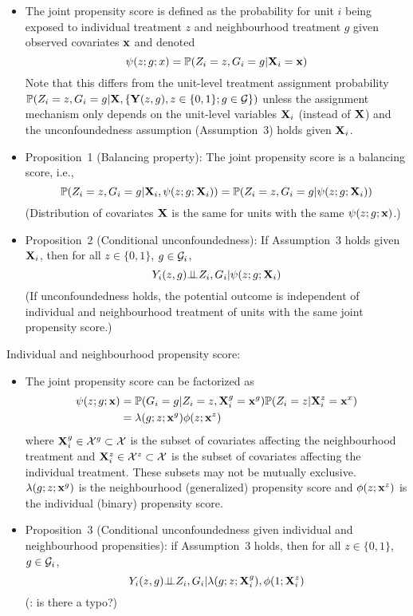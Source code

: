 \documentclass[10pt]{article}
\begin{document}
\begin{itemize}

\item
The joint propensity score is defined as the probability for unit $i$ being exposed to individual treatment $z$ and neighbourhood treatment $g$ given observed covariates $\mathbf{x}$ and denoted
\[
\psi(z;g;x) = \mathbb{P}(Z_i=z,G_i=g|\mathbf{X}_i=\mathbf{x})
\]
Note that this differs from the unit-level treatment assignment probability $\mathbb{P}(Z_i=z,G_i=g|\mathbf{X},\{\mathbf{Y}(z,g),z\in\{0,1\};g\in\mathcal{G}\})$ unless the assignment mechanism only depends on the unit-level variables $\mathbf{X}_i$ (instead of $\mathbf{X}$) and the unconfoundedness assumption (Assumption~3) holds given $\mathbf{X}_i$.

\item
Proposition~1 (Balancing property): The joint propensity score is a balancing score, i.e.,
\[
\mathbb{P}(Z_i=z,G_i=g|\mathbf{X}_i,\psi(z;g;\mathbf{X}_i)) = \mathbb{P}(Z_i=z,G_i=g|\psi(z;g;\mathbf{X}_i))
\]
(Distribution of covariates $\mathbf{X}$ is the same for units with the same $\psi(z;g;\mathbf{x})$.)

\item
Proposition~2 (Conditional unconfoundedness): If Assumption~3 holds given $\mathbf{X}_i$, then for all $z\in\{0,1\}$, $g\in\mathcal{G}_i$,
\[
Y_i(z,g) {\perp\!\!\!\perp} Z_i,G_i|\psi(z;g;\mathbf{X}_i)
\]
(If unconfoundedness holds, the potential outcome is independent of individual and neighbourhood treatment of units with the same joint propensity score.)

\end{itemize}

Individual and neighbourhood propensity score:

\begin{itemize}

\item
The joint propensity score can be factorized as
\begin{align*}
\psi(z;g;\mathbf{x}) &= \mathbb{P}(G_i=g|Z_i=z,\mathbf{X}_i^g=\mathbf{x}^g)\mathbb{P}(Z_i=z|\mathbf{X}_i^z=\mathbf{x}^x) \\
&= \lambda(g;z;\mathbf{x}^g)\phi(z;\mathbf{x}^z)
\end{align*}
where $\mathbf{X}_i^g\in\mathcal{X}^g\subset\mathcal{X}$ is the subset of covariates affecting the neighbourhood treatment and $\mathbf{X}_i^z\in\mathcal{X}^z\subset\mathcal{X}$ is the subset of covariates affecting the individual treatment. These subsets may not be mutually exclusive. $\lambda(g;z;\mathbf{x}^g)$ is the neighbourhood (generalized) propensity score and $\phi(z;\mathbf{x}^z)$ is the individual (binary) propensity score.

\item
Proposition~3 (Conditional unconfoundedness given individual and neighbourhood propensities): if Assumption~3 holds, then for all $z\in\{0,1\}$, $g\in\mathcal{G}_i$,
\[
Y_i(z,g) {\perp\!\!\!\perp} Z_i, G_i|\lambda(g;z;\mathbf{X}_i^g),\phi(1;\mathbf{X}_i^z)
\]
(\todo: is there a typo?)

\end{itemize}
\end{document}
